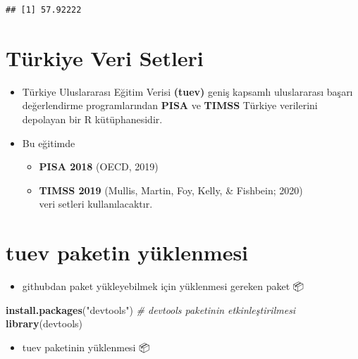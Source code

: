 \documentclass[
  oneside]{book}
\newenvironment{Shaded}{\begin{snugshade}}{\end{snugshade}}
\newcommand{\CommentTok}[1]{\textcolor[rgb]{0.56,0.35,0.01}{\textit{#1}}}
\newcommand{\FunctionTok}[1]{\textcolor[rgb]{0.13,0.29,0.53}{\textbf{#1}}}
\newcommand{\NormalTok}[1]{#1}
\newcommand{\StringTok}[1]{\textcolor[rgb]{0.31,0.60,0.02}{#1}}
\providecommand{\tightlist}{%
  \setlength{\itemsep}{0pt}\setlength{\parskip}{0pt}}
\begin{document}
\begin{verbatim}
## [1] 57.92222
\end{verbatim}

\hypertarget{tuxfcrkiye-veri-setleri}{%
\section{Türkiye Veri Setleri}\label{tuxfcrkiye-veri-setleri}}

\begin{itemize}
\item
  Türkiye Uluslararası Eğitim Verisi \textbf{(tuev)} geniş kapsamlı uluslararası başarı değerlendirme programlarından \textbf{PISA} ve \textbf{TIMSS} Türkiye verilerini depolayan bir R kütüphanesidir.
\item
  Bu eğitimde

  \begin{itemize}
  \tightlist
  \item
    \textbf{PISA 2018} (OECD, 2019) \\
  \item
    \textbf{TIMSS 2019} (Mullis, Martin, Foy, Kelly, \& Fishbein; 2020) \\
    veri setleri kullanılacaktır.
  \end{itemize}
\end{itemize}

\hypertarget{tuev-paketin-yuxfcklenmesi}{%
\section{\texorpdfstring{\textbf{tuev} paketin yüklenmesi}{tuev paketin yüklenmesi}}\label{tuev-paketin-yuxfcklenmesi}}

\begin{itemize}
\tightlist
\item
  githubdan paket yükleyebilmek için yüklenmesi gereken paket 📦
\end{itemize}

\begin{Shaded}
\begin{Highlighting}[]
\FunctionTok{install.packages}\NormalTok{(}\StringTok{"devtools"}\NormalTok{)}
\CommentTok{\# devtools paketinin etkinleştirilmesi}
\FunctionTok{library}\NormalTok{(devtools)}
\end{Highlighting}
\end{Shaded}

\begin{itemize}
\tightlist
\item
  tuev paketinin yüklenmesi 📦
\end{itemize}
\end{document}
